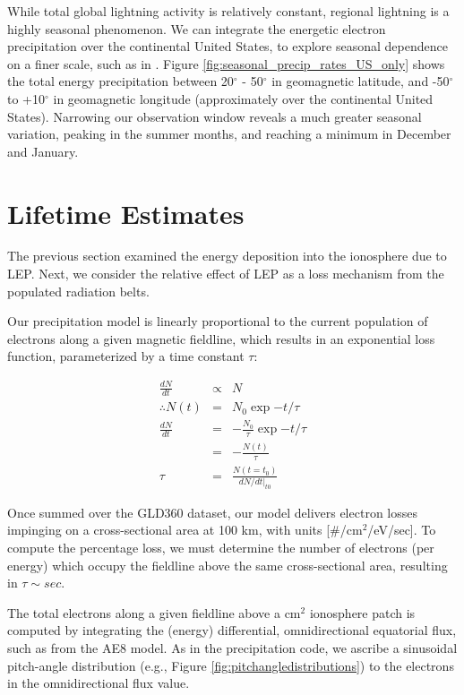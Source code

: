 While total global lightning activity is relatively constant, regional lightning is a highly seasonal phenomenon. We can integrate the energetic electron precipitation over the continental United States, to explore seasonal dependence on a finer scale, such as in \cite{Gemelos2009}. Figure \ref{fig:seasonal_precip_rates_US_only} shows the total energy precipitation between 20$^\circ$ - 50$^\circ$ in geomagnetic latitude, and -50$^\circ$ to +10$^\circ$ in geomagnetic longitude (approximately over the continental United States). Narrowing our observation window reveals a much greater seasonal variation, peaking in the summer months, and reaching a minimum in December and January.



\section{Lifetime Estimates}
The previous section examined the energy deposition into the ionosphere due to LEP. Next, we consider the relative effect of LEP as a loss mechanism from the populated radiation belts.

Our precipitation model is linearly proportional to the current population of electrons along a given magnetic fieldline, which results in an exponential loss function, parameterized by a time constant $\tau$:

\begin{eqnarray}
\frac{dN}{dt} & \propto & N \\
\therefore N(t) & = & N_0 \exp{-t/\tau} \\
\frac{dN}{dt} & = & -\frac{N_0}{\tau}\exp{-t/\tau} \\
& = & -\frac{N(t)}{\tau} \\
\tau & = & \frac{N(t=t_0)}{dN/dt\rvert_{t0}}
\label{eqn:tau}
\end{eqnarray}

Once summed over the GLD360 dataset, our model delivers electron losses impinging on a cross-sectional area at 100 km, with units [$\#$/cm$^2$/eV/sec]. To compute the percentage loss, we must determine the number of electrons (per energy) which occupy the fieldline above the same cross-sectional area, resulting in $\tau \sim sec$.

The total electrons along a given fieldline above a cm$^2$ ionosphere patch is computed by integrating the (energy) differential, omnidirectional equatorial flux, such as from the AE8 model. As in the precipitation code, we ascribe a sinusoidal pitch-angle distribution (e.g., Figure \ref{fig:pitchangledistributions}) to the electrons in the omnidirectional flux value. 

